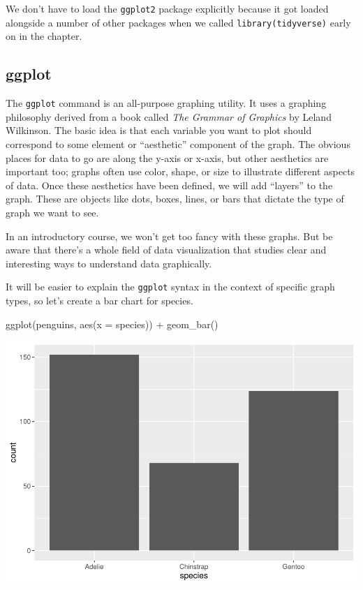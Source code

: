 \documentclass[
]{book}
\newenvironment{Shaded}{\begin{snugshade}}{\end{snugshade}}
\newcommand{\AttributeTok}[1]{\textcolor[rgb]{0.77,0.63,0.00}{#1}}
\newcommand{\FunctionTok}[1]{\textcolor[rgb]{0.00,0.00,0.00}{#1}}
\newcommand{\NormalTok}[1]{#1}
\newcommand{\SpecialCharTok}[1]{\textcolor[rgb]{0.00,0.00,0.00}{#1}}
\begin{document}
We don't have to load the \texttt{ggplot2} package explicitly because it got loaded alongside a number of other packages when we called \texttt{library(tidyverse)} early on in the chapter.

\hypertarget{categorical-ggplot}{%
\subsection{ggplot}\label{categorical-ggplot}}

The \texttt{ggplot} command is an all-purpose graphing utility. It uses a graphing philosophy derived from a book called \emph{The Grammar of Graphics} by Leland Wilkinson. The basic idea is that each variable you want to plot should correspond to some element or ``aesthetic'' component of the graph. The obvious places for data to go are along the y-axis or x-axis, but other aesthetics are important too; graphs often use color, shape, or size to illustrate different aspects of data. Once these aesthetics have been defined, we will add ``layers'' to the graph. These are objects like dots, boxes, lines, or bars that dictate the type of graph we want to see.

In an introductory course, we won't get too fancy with these graphs. But be aware that there's a whole field of data visualization that studies clear and interesting ways to understand data graphically.

It will be easier to explain the \texttt{ggplot} syntax in the context of specific graph types, so let's create a bar chart for species.

\begin{Shaded}
\begin{Highlighting}[]
\FunctionTok{ggplot}\NormalTok{(penguins, }\FunctionTok{aes}\NormalTok{(}\AttributeTok{x =}\NormalTok{ species)) }\SpecialCharTok{+}
    \FunctionTok{geom\_bar}\NormalTok{()}
\end{Highlighting}
\end{Shaded}

\includegraphics{intro_stats_files/figure-latex/unnamed-chunk-53-1.pdf}
\end{document}
